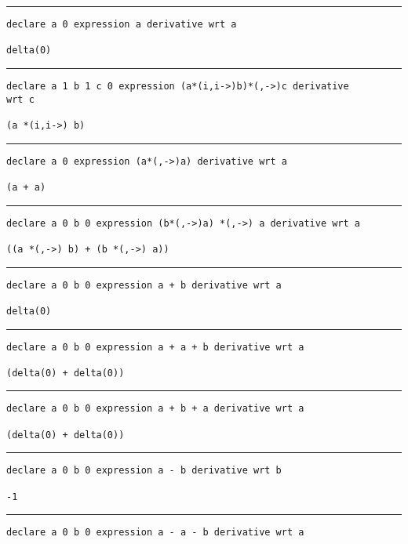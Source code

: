 \documentclass[12pt, a4paper]{report}
\begin{document}
\rule[0pt]{\textwidth}{0.4pt}
\begin{multicols}{2}
    \tiny
\begin{verbatim}
declare a 0 expression a derivative wrt a

delta(0)
\end{verbatim}
\vspace{-20pt} \rule[-10pt]{\columnwidth}{0.1pt} 
\begin{verbatim}
declare a 1 b 1 c 0 expression (a*(i,i->)b)*(,->)c derivative 
wrt c

(a *(i,i->) b)
\end{verbatim}
\vspace{-20pt} \rule[-10pt]{\columnwidth}{0.1pt} 
\begin{verbatim}
declare a 0 expression (a*(,->)a) derivative wrt a

(a + a)
\end{verbatim}
\vspace{-20pt} \rule[-10pt]{\columnwidth}{0.1pt} 
\begin{verbatim}
declare a 0 b 0 expression (b*(,->)a) *(,->) a derivative wrt a

((a *(,->) b) + (b *(,->) a))
\end{verbatim}
\vspace{-20pt} \rule[-10pt]{\columnwidth}{0.1pt} 
\begin{verbatim}
declare a 0 b 0 expression a + b derivative wrt a

delta(0)
\end{verbatim}
\vspace{-20pt} \rule[-10pt]{\columnwidth}{0.1pt} 
\begin{verbatim}
declare a 0 b 0 expression a + a + b derivative wrt a

(delta(0) + delta(0))
\end{verbatim}
\vspace{-20pt} \rule[-10pt]{\columnwidth}{0.1pt} 
\begin{verbatim}
declare a 0 b 0 expression a + b + a derivative wrt a

(delta(0) + delta(0))
\end{verbatim}
\vspace{-20pt} \rule[-10pt]{\columnwidth}{0.1pt} 
\begin{verbatim}
declare a 0 b 0 expression a - b derivative wrt b

-1
\end{verbatim}
\vspace{-20pt} \rule[-10pt]{\columnwidth}{0.1pt} 
\begin{verbatim}
declare a 0 b 0 expression a - a - b derivative wrt a


\end{verbatim}
\end{multicols}
\end{document}
